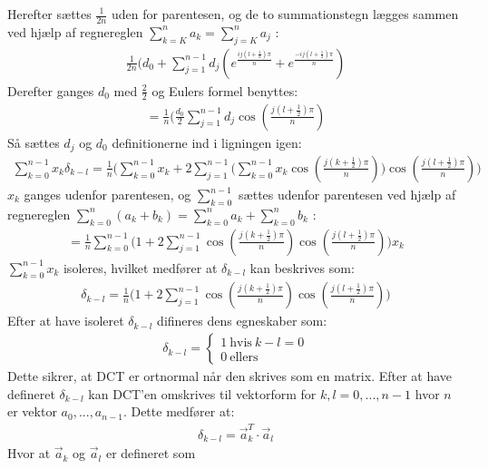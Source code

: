 Herefter sættes $\frac{1}{2n}$ uden for parentesen, og de to summationstegn lægges sammen ved hjælp af regnereglen $\sum\limits^n_{k = K} a_k = \sum\limits^n_{j=K} a_j$ :
\begin{align*}
\frac{1}{2n}(d_0+\sum^{n-1}_{j=1} d_j(e^{\frac{ij(l+\frac{1}{2})\pi}{n}} + e^{\frac{-ij(l+\frac{1}{2})\pi}{n}}) 
\end{align*}
Derefter ganges $d_0$ med $\frac{2}{2}$ og Eulers formel benyttes:
\begin{align}
= \frac{1}{n}(\frac{d_0}{2}\sum^{n-1}_{j=1} d_j \cos(\frac{j(l+\frac{1}{2})\pi}{n})
\end{align}
Så sættes $d_j$ og $ d_0$ definitionerne ind i ligningen igen:
\begin{align*}
\sum^{n-1}_{k=0}x_k \delta_{k-l} = \frac{1}{n} \Bigg( \sum^{n-1}_{k=0}x_k+2\sum^{n-1}_{j=1}\bigg( \sum^{n-1}_{k=0}x_k \cos(\frac{j(k+\frac{1}{2})\pi}{n})\bigg) \cos(\frac{j(l+\frac{1}{2})\pi}{n})\Bigg)
\end{align*}
$x_k$ ganges udenfor parentesen, og $\sum\limits^{n-1}_{k=0}$ sættes udenfor parentesen ved hjælp af regnereglen 
$\sum\limits^{n}_{k=0} (a_k + b_k) = \sum\limits^{n}_{k=0} a_k + \sum\limits^{n}_{k=0} b_k$ :
\begin{align*}
= \frac{1}{n}\sum^{n-1}_{k=0} \Bigg(1+2\sum^{n-1}_{j=1} \cos(\frac{j(k+\frac{1}{2})\pi}{n}) \cos(\frac{j(l+\frac{1}{2})\pi}{n}) \Bigg) x_k   
\end{align*}
$\sum\limits^{n-1}_{k=0} x_k$ isoleres, hvilket medfører at $\delta_{k-l}$ kan beskrives som:
\begin{align*}
\delta_{k-l} = \frac{1}{n} \Bigg(1+2\sum^{n-1}_{j=1} \cos(\frac{j(k+\frac{1}{2})\pi}{n}) \cos(\frac{j(l+\frac{1}{2})\pi}{n}) \Bigg) 
\end{align*}
Efter at have isoleret $\delta_{k-l}$ difineres dens egneskaber som:
\begin{align}
\delta_{k-l} = 
\begin{cases}
			1\ \text{hvis}\ k-l = 0 \\
			0\ \text{ellers}
\end{cases}
\label{eq:diff_delta}
\end{align}
Dette sikrer, at DCT er ortnormal når den skrives som en matrix.
Efter at have defineret $\delta_{k-l}$ kan DCT'en omskrives til  vektorform for $k,l = 0, ... ,n-1$ hvor $n$ er vektor $a_0, ... , a_{n-1}$. Dette medfører at:
\begin{align}
\delta_{k-l}= \vec{a}_k^{T} \cdot \vec{a}_l
\end{align}
Hvor at $\vec{a}_k$ og $\vec{a}_l$ er defineret som
